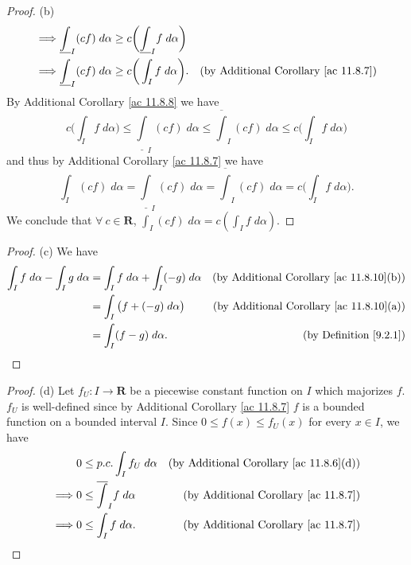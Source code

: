 \begin{proof}{(b)}
\begin{align*}
        \implies & \underline{\int}_I (cf) \; d \alpha \geq c\bigg(\underline{\int}_I f \; d \alpha\bigg)                                                                                                   \\
        \implies & \underline{\int}_I (cf) \; d \alpha \geq c\bigg(\int_I f \; d \alpha\bigg).                                                        & \text{(by Additional Corollary \ref{ac 11.8.7})}
    \end{align*}
    By Additional Corollary \ref{ac 11.8.8} we have
    \[
        c\bigg(\int_I f \; d \alpha\bigg) \leq \underline{\int}_I (cf) \; d \alpha \leq \overline{\int}_I (cf) \; d \alpha \leq c\bigg(\int_I f \; d \alpha\bigg)
    \]
    and thus by Additional Corollary \ref{ac 11.8.7} we have
    \[
        \int_I (cf) \; d \alpha = \underline{\int}_I (cf) \; d \alpha = \overline{\int}_I (cf) \; d \alpha = c\bigg(\int_I f \; d \alpha\bigg).
    \]
    We conclude that \(\forall\ c \in \mathbf{R}\), \(\int_I (cf) \; d \alpha = c (\int_I f \; d \alpha)\).
\end{proof}

\begin{proof}{(c)}
    We have
    \begin{align*}
        \int_I f \; d \alpha - \int_I g \; d \alpha & = \int_I f \; d \alpha + \int_I (-g) \; d \alpha & \text{(by Additional Corollary \ref{ac 11.8.10}(b))} \\
                                                    & = \int_I \big(f + (-g) \; d \alpha\big)          & \text{(by Additional Corollary \ref{ac 11.8.10}(a))} \\
                                                    & = \int_I (f - g) \; d \alpha.                    & \text{(by Definition \ref{9.2.1})}
    \end{align*}
\end{proof}

\begin{proof}{(d)}
    Let \(f_U : I \to \mathbf{R}\) be a piecewise constant function on \(I\) which majorizes \(f\).
    \(f_U\) is well-defined since by Additional Corollary \ref{ac 11.8.7} \(f\) is a bounded function on a bounded interval \(I\).
    Since \(0 \leq f(x) \leq f_U(x)\) for every \(x \in I\), we have
    \begin{align*}
                 & 0 \leq p.c. \int_I f_U \; d \alpha     & \text{(by Additional Corollary \ref{ac 11.8.6}(d))} \\
        \implies & 0 \leq \overline{\int}_I f \; d \alpha & \text{(by Additional Corollary \ref{ac 11.8.7})}    \\
        \implies & 0 \leq \int_I f \; d \alpha.           & \text{(by Additional Corollary \ref{ac 11.8.7})}
    \end{align*}
\end{proof}

